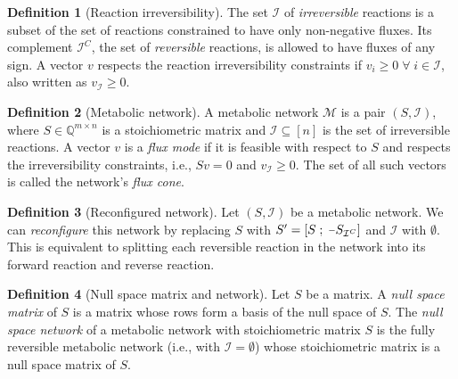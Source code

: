\documentclass{bioinfo}
\theoremstyle{plain}
\theoremstyle{definition}
\newtheorem{definition}{Definition} %
\newcommand{\minus}{\scalebox{0.75}[1.0]{$-$}}
\begin{document}

\begin{definition} [Reaction irreversibility]
    The set $\mathcal{I}$ of \emph{irreversible} reactions is a subset of the set of reactions constrained to have only non-negative fluxes. Its complement $\mathcal{I}^C$, the set of \emph{reversible} reactions, is allowed to have fluxes of any sign. A vector $v$ respects the reaction irreversibility constraints if $v_{i} \geq 0 \; \forall \; i \in \mathcal{I}$, also written as $v_{\mathcal{I}} \geq 0$.
\end{definition}

\begin{definition} [Metabolic network]
    A metabolic network $\mathcal{M}$ is a pair $(S, \mathcal{I})$, where $S \in \mathbb{Q}^{m \times n}$ is a stoichiometric matrix and $\mathcal{I} \subseteq [n]$ is the set of irreversible reactions. A vector $v$ is a \emph{flux mode} if it is feasible with respect to $S$ and respects the irreversibility constraints, i.e., $Sv = 0$ and $v_{\mathcal{I}} \geq 0$. The set of all such vectors is called the network's \emph{flux cone}.
\end{definition}

\begin{definition} [Reconfigured network]
    Let $(S, \mathcal{I})$ be a metabolic network. We can \emph{reconfigure} this network by replacing $S$ with $S' = [S \; ; \; \minus S_{\mathcal{I}^C}]$ and $\mathcal{I}$ with $\emptyset$. This is equivalent to splitting each reversible reaction in the network into its forward reaction and reverse reaction.
\end{definition}


\begin{definition} [Null space matrix and network]
Let $S$ be a matrix. A \emph{null space matrix} of $S$ is a matrix whose rows form a basis of the null space of $S$. The \emph{null space network} of a metabolic network with stoichiometric matrix $S$ is the fully reversible metabolic network (i.e., with $\mathcal{I} = \emptyset$) whose stoichiometric matrix is a null space matrix of $S$.
\end{definition}
\end{document}
